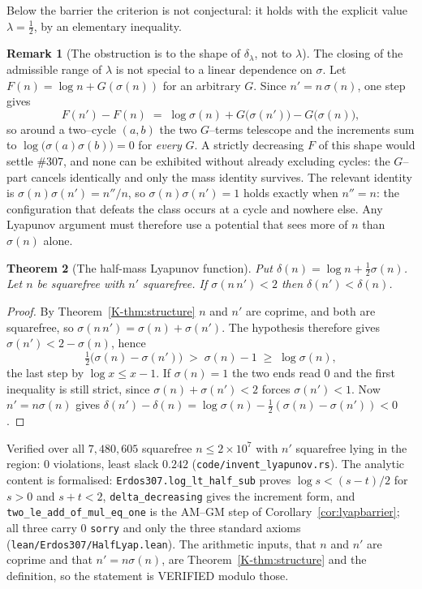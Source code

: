 \documentclass[11pt]{article}
\newtheorem{theorem}{Theorem}[section]
\theoremstyle{definition}
\newtheorem{remark}[theorem]{Remark}
\begin{document}
Below the barrier the criterion is not conjectural: it holds with the explicit value
$\lambda=\tfrac12$, by an elementary inequality.

\begin{remark}[The obstruction is to the shape of $\delta_\lambda$, not to $\lambda$]\label{rem:lyapshape}
The closing of the admissible range of $\lambda$ is not special to a linear dependence on $\sigma$.
Let $F(n)=\log n+G(\sigma(n))$ for an arbitrary $G$. Since $n'=n\,\sigma(n)$, one step gives
\[ F(n')-F(n)\;=\;\log\sigma(n)+G\bigl(\sigma(n')\bigr)-G\bigl(\sigma(n)\bigr), \]
so around a two--cycle $(a,b)$ the two $G$--terms telescope and the increments sum to
$\log\bigl(\sigma(a)\sigma(b)\bigr)=0$ for \emph{every} $G$. A strictly decreasing $F$ of this shape
would settle \#307, and none can be exhibited without already excluding cycles: the $G$--part
cancels identically and only the mass identity survives. The relevant identity is
$\sigma(n)\sigma(n')=n''/n$, so $\sigma(n)\sigma(n')=1$ holds exactly when $n''=n$: the configuration
that defeats the class occurs at a cycle and nowhere else. Any Lyapunov argument must therefore use a
potential that sees more of $n$ than $\sigma(n)$ alone.
\end{remark}

\begin{theorem}[The half-mass Lyapunov function]\label{thm:halflyap}
Put $\delta(n)=\log n+\tfrac12\sigma(n)$. Let $n$ be squarefree with $n'$ squarefree. If
$\sigma(n\,n')<2$ then $\delta(n')<\delta(n)$.
\end{theorem}
\begin{proof}
By Theorem~\ref{K-thm:structure} $n$ and $n'$ are coprime, and both are squarefree, so
$\sigma(n\,n')=\sigma(n)+\sigma(n')$. The hypothesis therefore gives $\sigma(n')<2-\sigma(n)$, hence
\[ \tfrac12\bigl(\sigma(n)-\sigma(n')\bigr)\;>\;\sigma(n)-1\;\ge\;\log\sigma(n), \]
the last step by $\log x\le x-1$. If $\sigma(n)=1$ the two ends read $0$ and the first inequality is
still strict, since $\sigma(n)+\sigma(n')<2$ forces $\sigma(n')<1$. Now $n'=n\sigma(n)$ gives
$\delta(n')-\delta(n)=\log\sigma(n)-\tfrac12(\sigma(n)-\sigma(n'))<0$.
\end{proof}
Verified over all $7{,}480{,}605$ squarefree $n\le2\times10^7$ with $n'$ squarefree lying in the
region: $0$ violations, least slack $0.242$ \textup{(\texttt{code/invent\_lyapunov.rs})}. The analytic content is formalised:
\texttt{Erdos307.log\_lt\_half\_sub} proves $\log s<(s-t)/2$ for $s>0$ and $s+t<2$,
\texttt{delta\_decreasing} gives the increment form, and
\texttt{two\_le\_add\_of\_mul\_eq\_one} is the \textup{AM--GM} step of
Corollary~\ref{cor:lyapbarrier}; all three carry $0$ \texttt{sorry} and only the three standard
axioms \textup{(\texttt{lean/Erdos307/HalfLyap.lean})}. The arithmetic inputs, that $n$ and $n'$ are
coprime and that $n'=n\sigma(n)$, are Theorem~\ref{K-thm:structure} and the definition, so the
statement is \textup{VERIFIED} modulo those.
\end{document}
